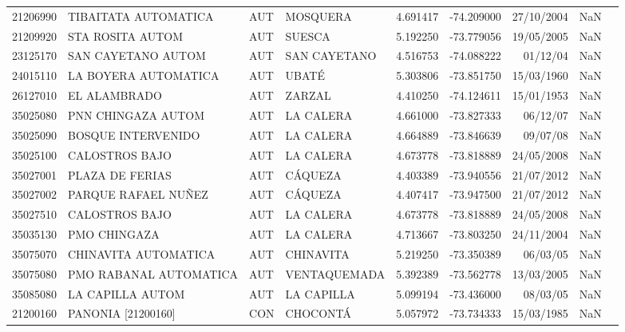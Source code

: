 \begin{landscape}
\begin{longtable}{lp{4cm}lp{3cm}lrrll}
   21206990 &        TIBAITATA AUTOMATICA &  AUT &          MOSQUERA &  4.691417 & -74.209000 &  27/10/2004 &         NaN \\
   21209920 &            STA ROSITA AUTOM &  AUT &            SUESCA &  5.192250 & -73.779056 &  19/05/2005 &         NaN \\
   23125170 &          SAN CAYETANO AUTOM &  AUT &      SAN CAYETANO &  4.516753 & -74.088222 &    01/12/04 &         NaN \\
   24015110 &        LA BOYERA AUTOMATICA &  AUT &             UBATÉ &  5.303806 & -73.851750 &  15/03/1960 &         NaN \\
   26127010 &                EL ALAMBRADO &  AUT &            ZARZAL &  4.410250 & -74.124611 &  15/01/1953 &         NaN \\
   35025080 &          PNN CHINGAZA AUTOM &  AUT &         LA CALERA &  4.661000 & -73.827333 &    06/12/07 &         NaN \\
   35025090 &          BOSQUE INTERVENIDO &  AUT &         LA CALERA &  4.664889 & -73.846639 &    09/07/08 &         NaN \\
   35025100 &              CALOSTROS BAJO &  AUT &         LA CALERA &  4.673778 & -73.818889 &  24/05/2008 &         NaN \\
   35027001 &             PLAZA DE FERIAS &  AUT &           CÁQUEZA &  4.403389 & -73.940556 &  21/07/2012 &         NaN \\
   35027002 &         PARQUE RAFAEL NUÑEZ &  AUT &           CÁQUEZA &  4.407417 & -73.947500 &  21/07/2012 &         NaN \\
   35027510 &              CALOSTROS BAJO &  AUT &         LA CALERA &  4.673778 & -73.818889 &  24/05/2008 &         NaN \\
   35035130 &                PMO CHINGAZA &  AUT &         LA CALERA &  4.713667 & -73.803250 &  24/11/2004 &         NaN \\
   35075070 &        CHINAVITA AUTOMATICA &  AUT &         CHINAVITA &  5.219250 & -73.350389 &    06/03/05 &         NaN \\
   35075080 &      PMO RABANAL AUTOMATICA &  AUT &      VENTAQUEMADA &  5.392389 & -73.562778 &  13/03/2005 &         NaN \\
   35085080 &            LA CAPILLA AUTOM &  AUT &        LA CAPILLA &  5.099194 & -73.436000 &    08/03/05 &         NaN \\
   21200160 &          PANONIA [21200160] &  CON &          CHOCONTÁ &  5.057972 & -73.734333 &  15/03/1985 &         NaN \\

\end{longtable}
\end{landscape}
